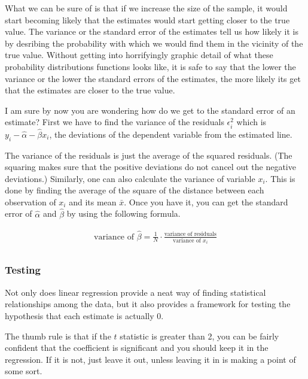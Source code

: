 \documentclass[12pt,onesided]{article}
\begin{document}
What we can be sure of is that if we increase the size of the
sample, it would start becoming likely that the estimates would
start getting closer to the true value. The variance or the standard
error of the estimates tell us how likely it is by desribing the
probability with which we would find them in the vicinity of the
true value. Without getting into horrifyingly graphic detail of what
these probability distributions functions looks like, it is safe to
say that the lower the variance or the lower the standard errors of
the estimates, the more likely its get that the estimates are closer
to the true value.


I am sure by now you are wondering how do we get to the standard
error of an estimate? First we have to find the variance of the
residuals $\epsilon_i^2$ which is $y_i-\hat{\alpha}-\hat{\beta}x_i$,
the deviations of the dependent variable from the estimated line.

The variance of the residuals is just the average of the squared
residuals. (The squaring makes sure that the positive deviations do
not cancel out the negative deviations.) Similarly, one can also
calculate the variance of variable $x_i$. This is done by finding
the average of the square of the distance between each observation
of $x_i$ and its mean $\bar{x}$. Once you have it, you can get the
standard error of $\hat{\alpha}$ and $\hat{\beta}$ by using the
following formula.

\begin{align*}
    \text{variance of }\hat{\beta}= \frac{1}{N}\cdot\frac{\text{variance of residuals}}{\text{variance of $x_i$}} \\
\end{align*}



\subsubsection*{Testing}

Not only does linear regression provide a neat way of finding
statistical relationships among the data, but it also provides a
framework for testing the hypothesis that each estimate is actually
0.

The thumb rule is that if the $t$ statistic is greater than 2, you
can be fairly confident that the coefficient is significant and you
should keep it in the regression. If it is not, just leave it out,
unless leaving it in is making a point of some sort.
\end{document}
